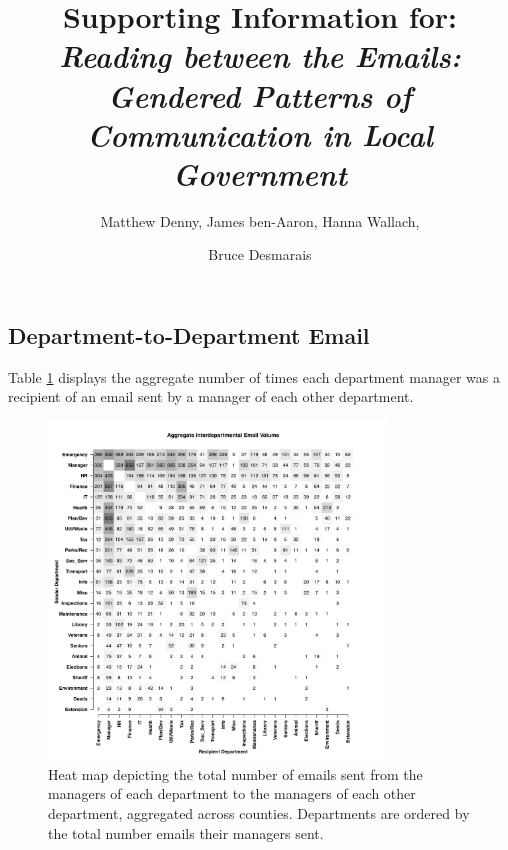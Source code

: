 \documentclass{pnastwo}
\begin{document}
\title{Supporting Information for: \emph{Reading between the Emails: Gendered Patterns of Communication in Local Government}}

\author{
Matthew Denny,
James ben-Aaron,
Hanna Wallach,
\and Bruce Desmarais
}

\contributor{\vspace{-.25cm}}


\maketitle

\begin{article}
	
\section{Department-to-Department Email }

Table \ref{fig:heatmaps} displays the aggregate number of times each department manager was a recipient of an email sent by a manager of each other department. 
	
	\begin{figure}[ht]
	\centering
	\includegraphics[width = 0.8\textwidth]{images/Aggregate_Email_Flows.pdf}
	\caption{\label{fig:heatmaps}Heat map depicting the total number of emails sent from the managers of each department to the managers of each other department, aggregated across counties. Departments are ordered by the total number emails their managers sent.}
	\end{figure}
	

\end{article}
\end{document}
